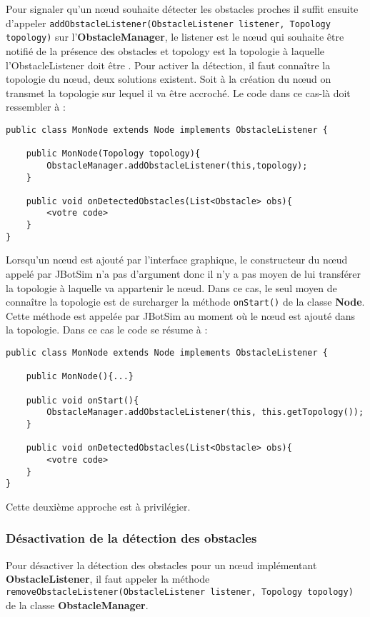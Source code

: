 \documentclass{article}
\begin{document}
Pour signaler qu'un n\oe ud souhaite détecter les obstacles proches il suffit ensuite d'appeler \texttt{add\-ObstacleListener(ObstacleListener listener, Topo\-logy topology)} sur l'\textbf{ObstacleManager}, le listener est le n\oe ud qui souhaite être notifié de la présence des obstacles et topology est la topologie à laquelle l'ObstacleListener doit être . Pour activer la détection, il faut connaître la topologie du n\oe ud, deux solutions existent. Soit à la création du n\oe ud on transmet la topologie sur lequel il va être accroché. Le code dans ce cas-là doit ressembler à :\smallskip
\begin{lstlisting}[frame=single]
public class MonNode extends Node implements ObstacleListener {

    public MonNode(Topology topology){
        ObstacleManager.addObstacleListener(this,topology);
    }

    public void onDetectedObstacles(List<Obstacle> obs){
        <votre code>
    }
}
\end{lstlisting}\smallskip

Lorsqu'un n\oe ud est ajouté par l'interface graphique, le constructeur du n\oe ud appelé par JBotSim n'a pas d'argument donc il n'y a pas moyen de lui transférer la topologie à laquelle va appartenir le n\oe ud. Dans ce cas, le seul moyen de connaître la topologie est de surcharger la méthode \texttt{onStart()} de la classe \textbf{Node}. Cette méthode est appelée par JBotSim au moment où le n\oe ud est ajouté dans la topologie. Dans ce cas le code se résume à :\smallskip
\begin{lstlisting}[frame=single]
public class MonNode extends Node implements ObstacleListener {

    public MonNode(){...}
    
    public void onStart(){
        ObstacleManager.addObstacleListener(this, this.getTopology());
    }
    
    public void onDetectedObstacles(List<Obstacle> obs){
        <votre code>
    }
}
\end{lstlisting}\smallskip

Cette deuxième approche est à privilégier.
\subsubsection{Désactivation de la détection des obstacles}

Pour désactiver la détection des obstacles pour un n\oe ud implémentant \textbf{ObstacleListener}, il faut appeler la méthode \texttt{removeObstacleListener(Obs\-tacleListener listener, Topology topology)} de la classe \textbf{ObstacleManager}.\medskip
\end{document}
